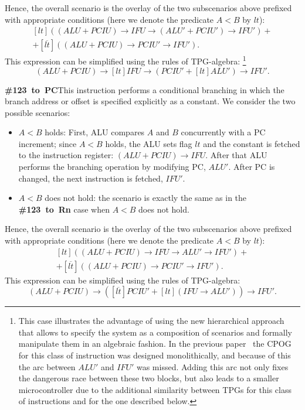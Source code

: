 Hence, the overall scenario is the overlay of the two subscenarios
above prefixed with appropriate conditions (here we denote the predicate
$A<B$ by $lt$): 
\[
\begin{array}{c}
[lt]((\mathit{ALU}+\mathit{PCIU})\!\rightarrow\!\mathit{IFU}\!\rightarrow\!(\mathit{ALU'}+\mathit{PCIU'})\!\rightarrow\!\mathit{IFU'})+\\
+[\overline{lt}]((\mathit{ALU}+\mathit{PCIU})\!\rightarrow\!\mathit{PCIU'}\!\rightarrow\!\mathit{IFU'}).
\end{array}
\]
This expression can be simplified using the rules of TPG-algebra:%
\footnote{This case illustrates the advantage of using the new hierarchical
approach that allows to specify the system as a composition of scenarios
and formally manipulate them in an algebraic fashion. In the previous
paper~\cite{2011_mokhov_iet} the CPOG for this class of instruction
was designed monolithically, and because of this the arc between $\mathit{ALU'}$
and $\mathit{IFU'}$ was missed. Adding this arc not only fixes the
dangerous race between these two blocks, but also leads to a smaller
microcontroller due to the additional similarity between TPGs for
this class of instructions and for the one described below.%
}
\[
(\mathit{ALU}+\mathit{PCIU})\!\rightarrow\![lt]\mathit{IFU}\!\rightarrow\!(\mathit{PCIU'}+[lt]\mathit{ALU'})\!\rightarrow\!\mathit{IFU'}.
\]


\textbf{\#123~to~PC}\quad{}This instruction performs a conditional
branching in which the branch address or offset is specified explicitly
as a constant. We consider the two possible scenarios:
\begin{itemize}
\item $A<B$ holds: First, ALU compares $A$ and $B$ concurrently with
a PC increment; since $A<B$ holds, the ALU sets flag $lt$ and the
constant is fetched to the instruction register: $(\mathit{ALU}+\mathit{PCIU})\rightarrow\mathit{IFU}$.
After that ALU performs the branching operation by modifying PC, $\mathit{ALU'}$.
After PC is changed, the next instruction is fetched, $\mathit{IFU'}$.
\item $A<B$ does not hold: the scenario is exactly the same as in the \textbf{\#123~to~Rn
}case when $A<B$ does not hold.
\end{itemize}
Hence, the overall scenario is the overlay of the two subscenarios
above prefixed with appropriate conditions (here we denote the predicate
$A<B$ by $lt$): 
\[
\begin{array}{c}
[lt]((\mathit{ALU}+\mathit{PCIU})\!\rightarrow\!\mathit{IFU}\!\rightarrow\!\mathit{ALU'}\!\rightarrow\!\mathit{IFU'})+\\
+[\overline{lt}]((\mathit{ALU}+\mathit{PCIU})\!\rightarrow\!\mathit{PCIU'}\!\rightarrow\!\mathit{IFU'}).
\end{array}
\]
This expression can be simplified using the rules of TPG-algebra:
\[
(\mathit{ALU}+\mathit{PCIU})\!\rightarrow\!([\overline{lt}]\mathit{PCIU'}+[lt](\mathit{IFU}\!\rightarrow\!\mathit{ALU'}))\!\rightarrow\!\mathit{IFU'}.
\]


